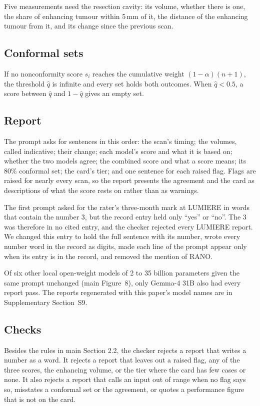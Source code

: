 \documentclass[11pt,a4paper]{article}
\begin{document}
Five measurements need the resection cavity: its volume, whether there is one, the share of enhancing tumour within
5\,mm of it, the distance of the enhancing tumour from it, and its change since the previous scan.

\subsection{Conformal sets}\label{sec:S29.3}

If no nonconformity score $s_i$ reaches the cumulative weight $(1-\alpha)(n+1)$, the threshold $\hat q$ is infinite
and every set holds both outcomes. When $\hat q < 0.5$, a score between $\hat q$ and $1 - \hat q$ gives an empty set.

\subsection{Report}\label{sec:S29.4}

The prompt asks for sentences in this order: the scan's timing; the volumes, called indicative; their change; each
model's score and what it is based on; whether the two models agree; the combined score and what a score means; its
80\% conformal set; the card's tier; and one sentence for each raised flag. Flags are raised for nearly every scan, so
the report presents the agreement and the card as descriptions of what the score rests on rather than as warnings.

The first prompt asked for the rater's three-month mark at LUMIERE in words that contain the number 3, but the record
entry held only ``yes'' or ``no''. The 3 was therefore in no cited entry, and the checker rejected every LUMIERE
report. We changed this entry to hold the full sentence with its number, wrote every number word in the record as
digits, made each line of the prompt appear only when its entry is in the record, and removed the mention of RANO.

Of six other local open-weight models of 2 to 35 billion parameters given the same prompt unchanged (main
Figure~8), only Gemma-4 31B also had every report pass. The reports regenerated with this paper's model
names are in Supplementary Section~S9.

\subsection{Checks}\label{sec:S29.5}

Besides the rules in main Section 2.2, the checker rejects a report that writes a number as a word. It rejects a
report that leaves out a raised flag, any of the three scores, the enhancing volume, or the tier where the card has
few cases or none. It also rejects a report that calls an input out of range when no flag says so, misstates a
conformal set or the agreement, or quotes a performance figure that is not on the card.
\end{document}
